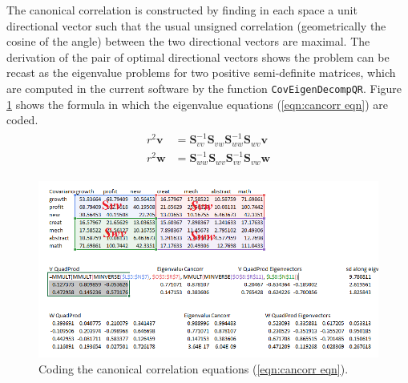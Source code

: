 \documentclass[article]{jss}
\numberwithin{equation}{subsection}
\begin{document}
        The canonical correlation is constructed by finding in each space a unit directional vector such that the usual unsigned correlation (geometrically the cosine of the angle) between the two directional vectors are maximal. The derivation of the pair of optimal directional vectors shows the problem can be recast as the eigenvalue problems for two positive semi-definite matrices, which are computed in the current software by the  function \texttt{CovEigenDecompQR}. Figure \ref{fig:Cancorr quadprod} shows the formula in which the eigenvalue equations (\ref{eqn:cancorr eqn}) are coded.
        \begin{align}\label{eqn:cancorr eqn}
        \begin{split}
        r^2\textbf{v}  &= \textbf{S}_{vv}^{ - 1}{\textbf{S}_{vw}}\textbf{S}_{ww}^{ - 1}{\textbf{S}_{wv}}\textbf{v} \\
        r^2\textbf{w} &= \textbf{S}_{ww}^{ - 1}{\textbf{S}_{wv}}\textbf{S}_{vv}^{ - 1}{\textbf{S}_{vw}}\textbf{w}
        \end{split}
        \end{align}
        \begin{figure}[!tbh]
          \vspace{-20pt}\includegraphics[width=\linewidth, keepaspectratio=true]{img/CanCorrSheetExplain_png}
          \vspace{-20pt}\centering{}\protect\caption{Coding the canonical correlation equations (\ref{eqn:cancorr eqn}).}\label{fig:Cancorr quadprod}
        \end{figure}
        
\end{document}
